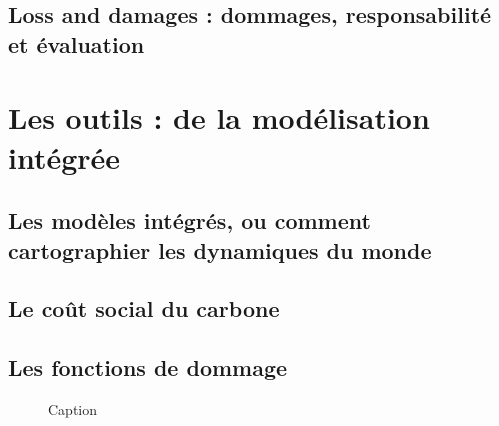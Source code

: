 \subsection{Loss and damages : dommages, responsabilité et évaluation}

\section{Les outils : de la modélisation intégrée}

\subsection{Les modèles intégrés, ou comment cartographier les dynamiques du monde}

\subsection{Le coût social du carbone}

\subsection{Les fonctions de dommage}

\begin{figure}
    \centering
    
    \caption{Caption}
    \label{fig:enter-label}
\end{figure}



